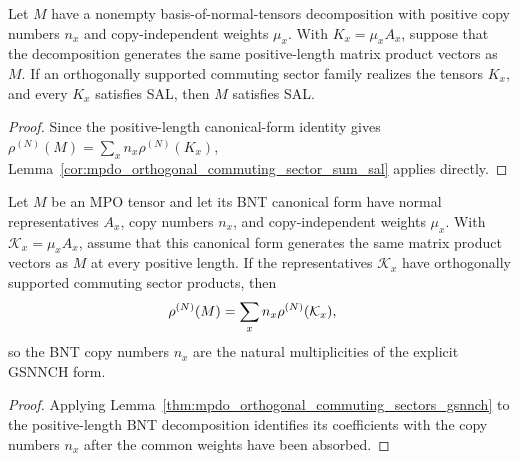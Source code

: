 \begin{corollary}
    \label{cor:mpdo_bnt_orthogonal_sector_sum_sal}
    \leanok
    Let $M$ have a nonempty basis-of-normal-tensors decomposition with
    positive copy numbers $n_x$ and copy-independent weights $\mu_x$. With
    $K_x=\mu_xA_x$, suppose that the decomposition generates the same
    positive-length matrix product vectors as $M$. If an
    orthogonally supported commuting sector family realizes the
    tensors $K_x$, and every $K_x$ satisfies SAL, then $M$ satisfies SAL.
\end{corollary}

\begin{proof}\leanok
    Since the positive-length canonical-form identity gives
    $\rho^{(N)}(M)=\sum_x n_x\rho^{(N)}(K_x)$,
    Lemma~\ref{cor:mpdo_orthogonal_commuting_sector_sum_sal} applies
    directly.
\end{proof}

\begin{lemma}
    \label{cor:mpdo_bnt_orthogonal_commuting_sectors_gsnnch}
    \leanok
    Let $M$ be an MPO tensor and let its BNT canonical form have normal
    representatives $A_x$, copy numbers $n_x$, and copy-independent weights
    $\mu_x$. With $\mathcal K_x=\mu_xA_x$, assume that this canonical form
    generates the same matrix product vectors as $M$ at every positive length.
    If the representatives $\mathcal K_x$ have orthogonally supported
    commuting sector products, then
    \begin{align}
        \rho^{(N)}(M)
         & =\sum_x n_x\rho^{(N)}(\mathcal K_x),
        \notag
    \end{align}
    so the BNT copy numbers $n_x$ are the natural multiplicities of the
    explicit GSNNCH form.
\end{lemma}

\begin{proof}\leanok
    Applying
    Lemma~\ref{thm:mpdo_orthogonal_commuting_sectors_gsnnch} to the
    positive-length BNT decomposition identifies its coefficients with the
    copy numbers $n_x$ after the common weights have been absorbed.
\end{proof}

